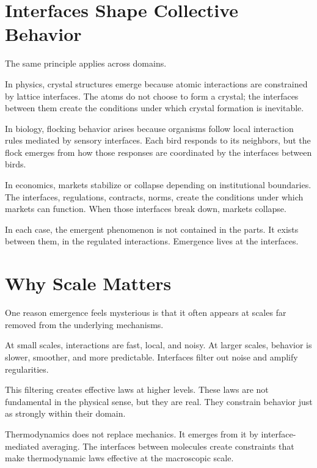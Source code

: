 \documentclass[
  openright]{book}
\begin{document}
\section{Interfaces Shape Collective
Behavior}\label{interfaces-shape-collective-behavior}

The same principle applies across domains.

In physics, crystal structures emerge because atomic interactions are
constrained by lattice interfaces. The atoms do not choose to form a
crystal; the interfaces between them create the conditions under which
crystal formation is inevitable.

In biology, flocking behavior arises because organisms follow local
interaction rules mediated by sensory interfaces. Each bird responds to
its neighbors, but the flock emerges from how those responses are
coordinated by the interfaces between birds.

In economics, markets stabilize or collapse depending on institutional
boundaries. The interfaces, regulations, contracts, norms, create the
conditions under which markets can function. When those interfaces break
down, markets collapse.

In each case, the emergent phenomenon is not contained in the parts. It
exists between them, in the regulated interactions. Emergence lives at
the interfaces.

\section{\texorpdfstring{Why Scale
Matters}{Why Scale Matters}}\label{why-scale-matters}

One reason emergence feels mysterious is that it often appears at
scales far removed from the underlying mechanisms.

At small scales, interactions are fast, local, and
noisy. At larger scales, behavior is slower,
smoother, and more predictable. Interfaces filter out noise
and amplify regularities.

This filtering creates effective laws at higher
levels. These laws are not fundamental in the physical sense, but they
are real. They constrain behavior just as strongly within their domain.

Thermodynamics does not replace mechanics. It emerges from it by
interface-mediated averaging. The interfaces between molecules create
constraints that make thermodynamic laws effective at the macroscopic
scale.
\end{document}
